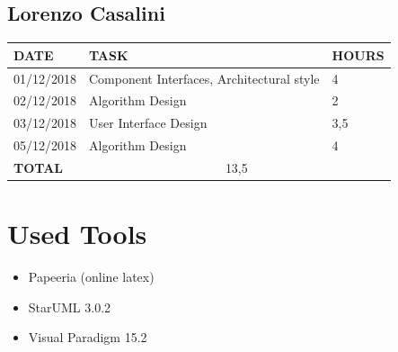\documentclass[12pt]{article}
\begin{document}
\subsection{Lorenzo Casalini}

\begin{center}
\begin{tabular}{ |p{}|p{}|p{}| } 
 \hline
 \textbf{DATE} & \textbf{TASK} & \textbf{HOURS} \\ 
  \hline
 01/12/2018 & Component Interfaces, Architectural style & 4\\
 \hline 
 02/12/2018 & Algorithm Design & 2 \\
 \hline
 03/12/2018 & User Interface Design & 3,5\\ 
 \hline 
 05/12/2018 & Algorithm Design & 4\\
  
  \hline
  \textbf{TOTAL} & \multicolumn{2}{c|}{13,5} \\ 
  \hline
\end{tabular}
\end{center}


\section{Used Tools}
\begin{itemize}
    \item Papeeria (online latex)
    \item StarUML 3.0.2
    \item Visual Paradigm 15.2
\end{itemize}
\end{document}
